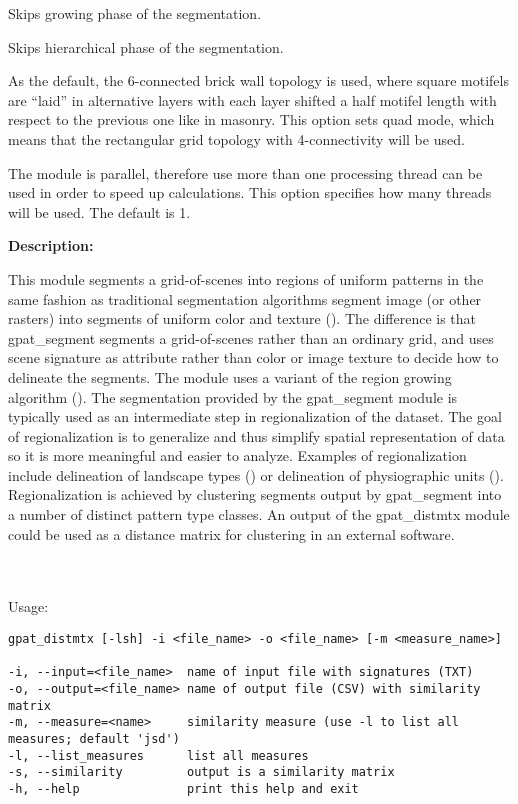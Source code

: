 
Skips growing phase of the segmentation.


Skips hierarchical phase of the segmentation.


As the default, the 6-connected brick wall topology is used, where square motifels are “laid” in alternative layers with each layer shifted a half motifel length with respect to the previous one like in masonry. 
This option sets quad mode, which means that the rectangular grid topology with 4-connectivity will be used. 


The module is parallel, therefore use more than one processing thread can be used in order to speed up calculations. 
This option specifies how many threads will be used. 
The default is 1.

{\bf Description:}

This module segments a grid-of-scenes into regions of uniform patterns in the same fashion as traditional segmentation algorithms segment image (or other rasters) into segments of uniform color and texture (\cite{Niesterowicz2013}).
The difference is that gpat\_segment segments a grid-of-scenes rather than an ordinary grid, and uses scene signature as attribute rather than color or image texture to decide how to delineate the segments. 
The module uses a variant of the region growing algorithm (\cite{Camara1996,Li2004c,Blaschke2010}).
The segmentation provided by the gpat\_segment module is typically used as an intermediate step in regionalization of the
dataset. 
The goal of regionalization is to generalize and thus simplify spatial representation of data so it is more meaningful and
easier to analyze.
Examples of regionalization include delineation of landscape types  (\cite{Niesterowicz2013}) or delineation of physiographic units (\cite{Jasiewicz2014}).
Regionalization is achieved by clustering segments output by gpat\_segment into a number of distinct pattern type classes.
An output of the gpat\_distmtx module could be used as a distance matrix for clustering in an external software.

{}
\\\\
Usage:

\begin{minipage}{\linewidth}
\begin{lstlisting}
gpat_distmtx [-lsh] -i <file_name> -o <file_name> [-m <measure_name>]

-i, --input=<file_name>  name of input file with signatures (TXT)
-o, --output=<file_name> name of output file (CSV) with similarity matrix
-m, --measure=<name>     similarity measure (use -l to list all measures; default 'jsd')
-l, --list_measures      list all measures
-s, --similarity         output is a similarity matrix
-h, --help               print this help and exit
\end{lstlisting}
\end{minipage}

